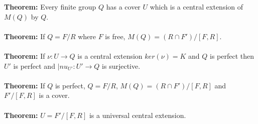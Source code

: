 {\bf Theorem:} Every finite group $Q$ has a cover $U$ which is a central extension of $M(Q)$ by $Q$.
\\
\\
{\bf Theorem:} If $Q=F/R$ where $F$ is free, $M(Q)= (R \cap F')/[F,R]$.
\\
\\
{\bf Theorem:} If $\nu: U \rightarrow Q$ is a central extension $ker(\nu)=K$ and $Q$ is perfect then
$U'$ is perfect and $|nu_{U'}: U' \rightarrow Q$ is surjective.
\\
\\
{\bf Theorem:} If $Q$ is perfect, $Q=F/R$, $M(Q)= (R \cap F')/[F,R]$ and $F'/[F,R]$ is a cover.
\\
\\
{\bf Theorem:} $U = F'/[F,R]$ is a universal central extension.
